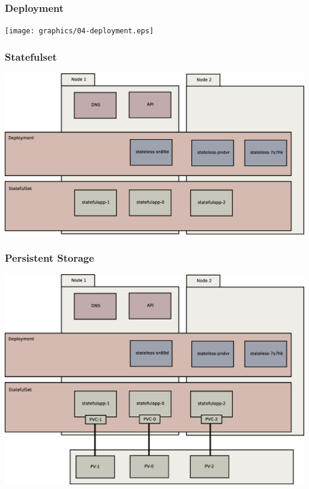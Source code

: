 \documentclass{beamer}
\begin{document}
\begin{frame}
    \frametitle{Deployment}
    \texttt{[image: graphics/04-deployment.eps]}
\end{frame}

\begin{frame}
    \frametitle{Statefulset}
    \includegraphics[width=\textwidth,height=\textheight,keepaspectratio]{graphics/05-statefulSet.eps}
\end{frame}

\begin{frame}
    \frametitle{Persistent Storage}
    \includegraphics[width=\textwidth,height=\textheight,keepaspectratio]{graphics/06-persistence.eps}
\end{frame}
\end{document}
